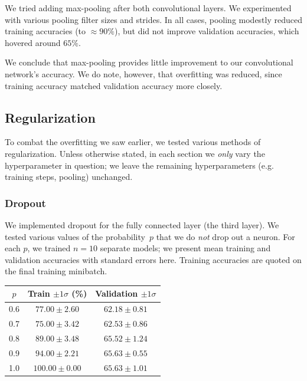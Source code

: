 \documentclass{article}
\begin{document}
\begin{multicols}{2}
We tried adding max-pooling
after both convolutional layers.
We experimented with various pooling filter sizes and strides.
In all cases,
pooling modestly reduced training accuracies
(to $\approx 90\%$),
but did not improve validation accuracies,
which hovered around $65\%$.

We conclude that max-pooling provides little improvement
to our convolutional network's accuracy.
We do note, however, that overfitting was reduced,
since training accuracy matched validation accuracy more closely.

\subsection{Regularization}

To combat the overfitting we saw earlier,
we tested various methods of regularization.
Unless otherwise stated,
in each section we \emph{only} vary the hyperparameter in question;
we leave the remaining hyperparameters (e.g. training steps, pooling) unchanged.


\subsubsection{Dropout}


We implemented dropout for the fully connected layer (the third layer).
We tested various values of the probability~$p$
that we do \emph{not} drop out a neuron.
For each $p$, we trained $n=10$ separate models;
we present mean training and validation accuracies
with standard errors here.
Training accuracies are quoted on the final training minibatch.
\begin{center}
    \begin{tabular}{c|cc}
        $p$ & Train $\pm 1 \sigma$ (\%) & Validation $\pm 1 \sigma$\\\hline
        0.6 &  $77.00 \pm 2.60$ & $62.18 \pm 0.81$ \\
        0.7 &  $75.00 \pm 3.42$ & $62.53 \pm 0.86$ \\
        0.8 &  $89.00 \pm 3.48$ & $65.52 \pm 1.24$ \\
        0.9 &  $94.00 \pm 2.21$ & $65.63 \pm 0.55$ \\
        1.0 & $100.00 \pm 0.00$ & $65.63 \pm 1.01$ \\
    \end{tabular}
\end{center}


\end{multicols}
\end{document}
